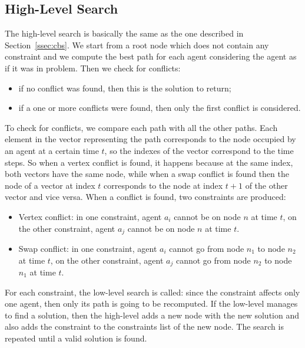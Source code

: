 \subsection{High-Level Search}
The high-level search is basically the same as the one described in
Section~\ref{ssec:cbs}. We start from a root node which does not contain any
constraint and we compute the best path for each agent considering the agent as
if it was in  problem. Then we check for conflicts:
\begin{itemize}
  \item if no conflict was found, then this is the solution to return;
  \item if a one or more conflicts were found, then only the first conflict is
    considered. 
\end{itemize}
To check for conflicts, we compare each path with all the other paths. Each
element in the vector representing the path corresponds to the node occupied by
an agent at a certain time $t$, so the indexes of the vector correspond to the
time steps. So when a vertex conflict is found, it happens because at the same
index, both vectors have the same node, while when a swap conflict is found
then the node of a vector at index $t$ corresponds to the node at index $t+1$ 
of the other vector and vice versa. \newline
When a conflict is found, two constraints are produced:
\begin{itemize}
  \item Vertex conflict: in one constraint, agent $a_i$ cannot be on node $n$
    at time $t$, on the other constraint, agent $a_j$ cannot be on node $n$ at
    time $t$.
  \item Swap conflict: in one constraint, agent $a_i$ cannot go from node $n_1$
    to node $n_2$ at time $t$, on the other constraint, agent $a_j$ cannot go
    from node $n_2$ to node $n_1$ at time $t$. 
\end{itemize}
For each constraint, the low-level search is called: since the constraint
affects only one agent, then only its path is going to be recomputed. If the
low-level manages to find a solution, then the high-level adds a new node with
the new solution and also adds the constraint to the constraints list of the
new node. The search is repeated until a valid solution is found. 
